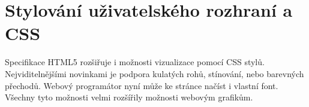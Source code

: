 \section{Stylování uživatelského rozhraní a CSS}

Specifikace HTML5 rozšiřuje i možnosti vizualizace pomocí CSS stylů. Nejviditelnějšími novinkami je podpora kulatých rohů, stínování, nebo barevných přechodů. Webový programátor nyní může ke stránce načíst i vlastní font. Všechny tyto možnosti velmi rozšířily možnosti webovým grafikům.








